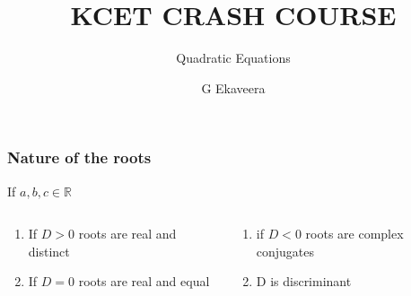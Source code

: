 \documentclass[aspectratio=169]{beamer}
\title{KCET CRASH COURSE}
\subtitle{Quadratic Equations}
\author{G Ekaveera}
\begin{document}
\begin{frame}
    \frametitle{Nature of the roots}
    If $a,b,c \in \mathbb{R}$
    \begin{columns}
        \begin{column}{.45\textwidth}
            \begin{enumerate}
                \item If $D > 0$ roots are real and distinct
                \item If $D=0$ roots are real and equal
            \end{enumerate}
        \end{column}
        \begin{column}{.45\textwidth}
            \begin{enumerate}
                \addtocounter{enumi}{2}
                \item if $D <0$ roots are complex conjugates
                \item D is discriminant
            \end{enumerate}
        \end{column}
    \end{columns}
\end{frame}
\end{document}
